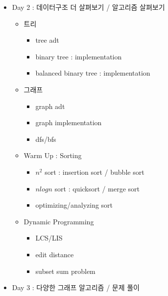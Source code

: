 \documentclass[11pt, a4paper]{article}
\begin{document}
\begin{center}
\begin{flushleft}
\begin{itemize}
\item Day 2 : 데이터구조 더 살펴보기 / 알고리즘 살펴보기 

\begin{itemize} 

\item 트리 
\begin{itemize} 
 \item tree adt
\item binary tree : implementation 
\item balanced binary tree : implementation 
\end{itemize} 
\item 그래프 
\begin{itemize} 
\item graph adt 
\item graph implementation 
\item dfs/bfs 
\end{itemize}

\item Warm Up : Sorting 
\begin{itemize} 
\item $n^2$ sort : insertion sort / bubble sort 
\item $n log n$ sort : quicksort / merge sort 
\item optimizing/analyzing sort 
\end{itemize}

\item Dynamic Programming 
\begin{itemize} 
\item LCS/LIS
\item edit distance
\item subset sum problem 
\end{itemize}

\end{itemize}



\item Day 3 : 다양한 그래프 알고리즘 / 문제 풀이 


\end{itemize}
\end{flushleft}
\end{center}
\end{document}
